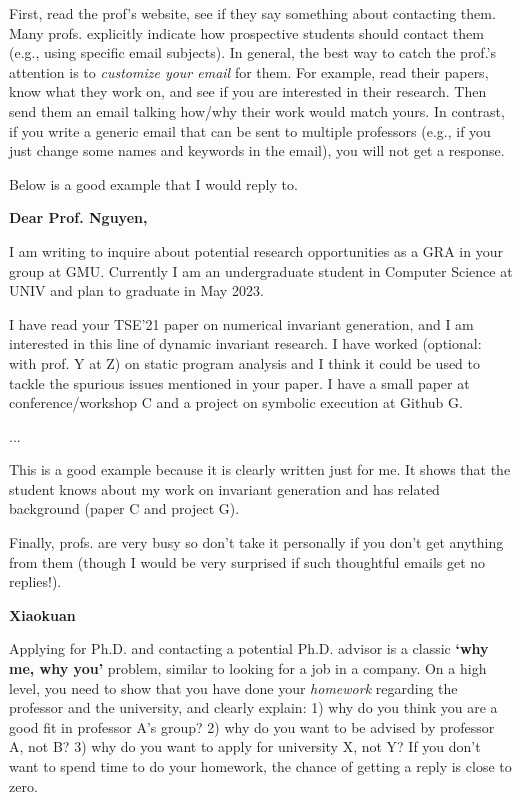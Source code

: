 \documentclass[11pt]{article}
\newenvironment{commentbox}[1][]{
\small
    \begin{cbox}
    \textbf{#1} 
 }{
   \end{cbox}
}
\begin{document}
First, read the prof's website, see if they say something about contacting them. Many profs. explicitly indicate how prospective students should contact them (e.g., using specific email subjects). 
In general, the best way to catch the prof.'s attention is to \emph{customize your email} for them.  For example, read their papers, know what they work on, and see if you are interested in their research. Then send them an email talking how/why their work would match yours.
In contrast, if you write a generic email that can be sent to multiple professors (e.g., if you just change some names and keywords in the email), you will not get a response. 

Below is a good example that I would reply to.   

\begin{commentbox}[Dear Prof. Nguyen,]

I am writing to inquire about potential research opportunities as a GRA in your group at GMU. Currently I am an undergraduate student in Computer Science at UNIV and plan to graduate in May 2023.

 
I have read your TSE'21 paper on numerical invariant generation, and I am interested in this line of dynamic invariant research. I have worked (optional: with prof. Y at Z) on static program analysis and I think it could be used to tackle the spurious issues mentioned in your paper. I have a small paper at conference/workshop C and a project on symbolic execution at Github G.

...

This is a good example because it is clearly written just for me.  It shows that the student knows about my work on invariant generation and has related  background (paper C and project G). 
\end{commentbox}

Finally, profs. are very busy so don't take it personally if you don't get anything from them (though I would be very surprised if such thoughtful emails get no replies!). 


\begin{commentbox}[Xiaokuan]
    Applying for Ph.D. and contacting a potential Ph.D. advisor is a classic {\bf `why me, why you'} problem, 
similar to looking for a job in a company.
On a high level,
you need to show that you have done your {\it homework}
regarding the professor and the university,
and clearly explain:
1) why do you think you are a good fit in professor A's group?
2) why do you want to be advised by professor A, not B? 
3) why do you want to apply for university X, not Y?
If you don't want to spend time to do your homework,
the chance of getting a reply is close to zero.
\end{commentbox}
\end{document}
